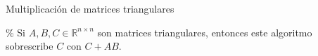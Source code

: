 \begin{algorithm}[H]
    \caption{Multiplicación de matrices triangulares}
    \% Si $A,B,C\in\mathbb{R}^{n\times n}$ son matrices triangulares,
    entonces este algoritmo sobrescribe $C$ con $C+AB$.

\end{algorithm}

